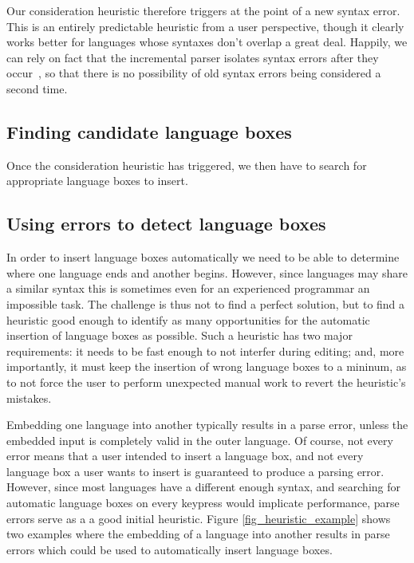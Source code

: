 \documentclass[sigplan,screen]{acmart}\settopmatter{printfolios=true,printccs=false,printacmref=false}
\begin{document}
Our consideration heuristic therefore triggers at the point of a new syntax
error. This is an entirely predictable heuristic from a user perspective,
though it clearly works better for languages whose syntaxes don't overlap a
great deal. Happily, we can rely on fact that the incremental parser isolates
syntax errors after they occur~\cite[p.~93]{wagner98practicalalgorithms}, so
that there is no possibility of old syntax errors being considered a second
time.


\subsection{Finding candidate language boxes}

Once the consideration heuristic has triggered, we then have to search for
appropriate language boxes to insert.


\subsection{Using errors to detect language boxes}
\label{sec_finding_lbox_candidates}

In order to insert language boxes automatically we need to be able to determine
where one language ends and another begins. However, since languages may share
a similar syntax this is sometimes even for an experienced programmar an
impossible task. The challenge is thus not to find a perfect solution, but to
find a heuristic good enough to identify as many opportunities for the
automatic insertion of language boxes as possible. Such a heuristic has two
major requirements: it needs to be fast enough to not interfer during editing;
and, more importantly, it must keep the insertion of wrong language boxes to a
mininum, as to not force the user to perform unexpected manual work to revert
the heuristic's mistakes.

Embedding one language into another typically results in a parse error, unless
the embedded input is completely valid in the outer language. Of course, not
every error means that a user intended to insert a language box, and not every
language box a user wants to insert is guaranteed to produce a parsing error.
However, since most languages have a different enough syntax, and searching for
automatic language boxes on every keypress would implicate performance, parse
errors serve as a a good initial heuristic. Figure \ref{fig_heuristic_example}
shows two examples where the embedding of a language into another results in
parse errors which could be used to automatically insert language boxes.
\end{document}
